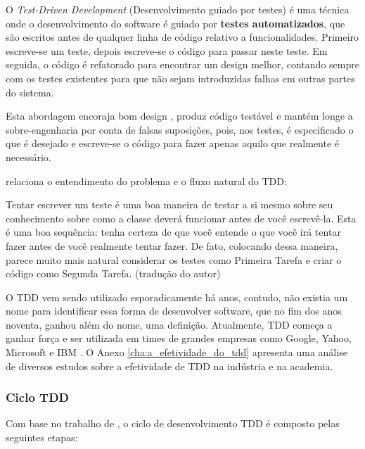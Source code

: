 O \textit{Test-Driven Development} (Desenvolvimento guiado por testes) é uma técnica onde o desenvolvimento do software é guiado por \textbf{testes automatizados}, que são escritos antes de qualquer linha de código relativo a funcionalidades. Primeiro escreve-se um teste, depois escreve-se o código para passar neste teste. Em seguida, o código é refatorado para encontrar um design melhor, contando sempre com os testes existentes para que não sejam introduzidas falhas em outras partes do sistema.

Esta abordagem encoraja bom design \cite{GrowingOOByTests}, produz código testável e mantém longe a sobre-engenharia por conta de falsas suposições, pois, nos testes, é especificado o que é desejado e escreve-se o código para fazer apenas aquilo que realmente é necessário. \cite{TestDrivenKoskela, TDDbyExample, EmpiricalTDD}

 relaciona o entendimento do problema e o fluxo natural do TDD:

\begin{citacao}
Tentar escrever um teste é uma boa maneira de testar a si mesmo sobre seu conhecimento sobre como a classe deverá funcionar antes de você escrevê-la. Esta é uma boa sequência: tenha certeza de que você entende o que você irá tentar fazer antes de você realmente tentar fazer. De fato, colocando dessa maneira, parece muito mais natural considerar os testes como Primeira Tarefa e criar o código como Segunda Tarefa. (tradução do autor)
\end{citacao}

O TDD vem sendo utilizado esporadicamente há anos, contudo, não existia um nome para identificar essa forma de desenvolver software, que no fim dos anos noventa, ganhou além do nome, uma definição. Atualmente, TDD começa a ganhar força e ser utilizada em times de grandes empresas como Google, Yahoo, Microsoft e IBM \cite{EmpiricalTDD}. O Anexo \ref{cha:a_efetividade_do_tdd} apresenta uma análise de diversos estudos sobre a efetividade de TDD na indústria e na academia.

\subsubsection{Ciclo TDD}
\label{ssub:ciclo_tdd}

Com base no trabalho de , o ciclo de desenvolvimento TDD é composto pelas seguintes etapas:

